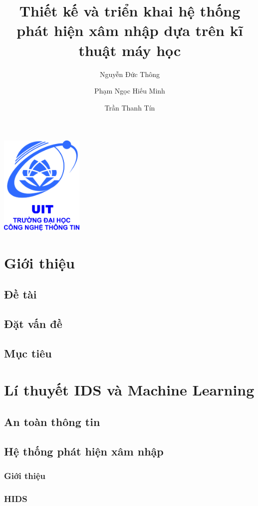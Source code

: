 \documentclass{article}
\title{Thiết kế và triển khai hệ thống phát hiện xâm nhập dựa trên kĩ thuật máy học}
\author{
    Nguyễn Đức Thông
    \and
    Phạm Ngọc Hiếu Minh
    \and
    Trần Thanh Tín
}
\begin{document}
    \maketitle
    \centering
    \includegraphics[width=4cm]{logo}
    \newpage
    \tableofcontents
    \newpage

    \begin{flushleft}
        \section{Giới thiệu}
        \subsection{Đề tài}
        \subsection{Đặt vấn đề}
        \subsection{Mục tiêu}
        \newpage
        \section{Lí thuyết IDS và Machine Learning}
        \subsection{An toàn thông tin}
        \subsection{Hệ thống phát hiện xâm nhập}
        \subsubsection{Giới thiệu}
        \subsubsection{HIDS}

\end{flushleft}
\end{document}
